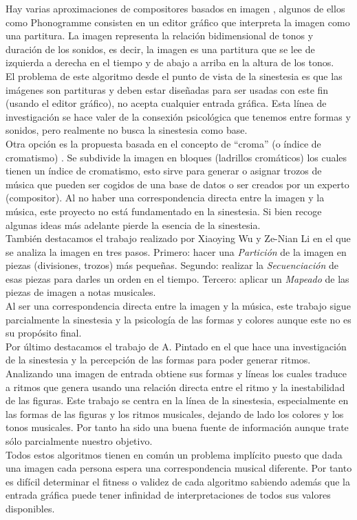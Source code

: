 Hay varias aproximaciones de compositores basados en imagen , algunos de ellos como Phonogramme \cite{ImageBaseComposition} \cite{Phonogramme} consisten en un editor gráfico que interpreta la imagen como una partitura. La imagen representa la relación bidimensional de tonos y duración de los sonidos, es decir, la imagen es una partitura que se lee de izquierda a derecha en el tiempo y de abajo a arriba en la altura de los tonos. 
\\El problema de este algoritmo desde el punto de vista de la sinestesia es que las imágenes son partituras y deben estar diseñadas para ser usadas con este fin (usando el editor gráfico), no acepta cualquier entrada gráfica. Esta línea de investigación se hace valer de la consexión psicológica que tenemos entre formas y sonidos, pero realmente no busca la sinestesia como base.\\

Otra opción es la propuesta basada en el concepto de ``croma'' (o índice de cromatismo) \cite{bricksConvertsMusic}. Se subdivide la imagen en bloques (ladrillos cromáticos) los cuales tienen un índice de cromatismo, esto sirve para generar o asignar trozos de música que pueden ser cogidos de una base de datos o ser creados por un experto (compositor). Al no haber una correspondencia directa entre la imagen y la música, este proyecto no está fundamentado en la sinestesia. Si bien recoge algunas ideas más adelante pierde la esencia de la sinestesia.\\

También destacamos el trabajo realizado por Xiaoying Wu y Ze-Nian Li \cite{ImageBaseComposition} en el que se analiza la imagen en tres pasos. Primero: hacer una \emph{Partición} de la imagen en piezas (divisiones, trozos) más pequeñas. Segundo: realizar la \emph{Secuenciación} de esas piezas para darles un orden en el tiempo. Tercero: aplicar un \emph{Mapeado} de las piezas de imagen a notas musicales.
\\Al ser una correspondencia directa entre la imagen y la música, este trabajo sigue parcialmente la sinestesia y la psicología de las formas y colores aunque este no es su propósito final.\\ 

Por último destacamos el trabajo de A. Pintado \cite{portutesis} en el que hace una investigación de la sinestesia y la percepción de las formas para poder generar ritmos. Analizando una imagen de entrada obtiene sus formas y líneas los cuales traduce a ritmos que genera usando  una relación directa entre el ritmo y la inestabilidad de las figuras. Este trabajo se centra en la línea de la sinestesia, especialmente en las formas de las figuras y los ritmos musicales, dejando de lado los colores y los tonos musicales. Por tanto ha sido una buena fuente de información aunque trate sólo parcialmente nuestro objetivo.\\ 

Todos estos algoritmos tienen en común un problema implícito puesto que dada una imagen cada persona espera una correspondencia musical diferente. Por tanto es difícil determinar el fitness o validez de cada algoritmo sabiendo además que la entrada gráfica puede tener infinidad de interpretaciones de todos sus valores disponibles.

